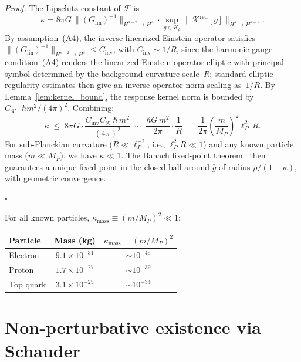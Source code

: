 \documentclass[12pt,a4paper]{article}
\begin{document}
\noindent\emph{Proof.} The Lipschitz constant of $\mathcal{F}$ is
\begin{equation}
\kappa = 8\pi G\,\bigl\|(G_{\mathrm{lin}})^{-1}\bigr\|_{H^{s-2}\to H^s}
\cdot \sup_{g \in K_\rho}
\bigl\|\mathcal{K}^{\mathrm{red}}[g]\bigr\|_{H^s \to H^{s-2}}.
\end{equation}
By assumption~(A4), the inverse linearized Einstein operator satisfies
$\|(G_{\mathrm{lin}})^{-1}\|_{H^{s-2}\to H^s} \leq C_{\mathrm{inv}}$, with
$C_{\mathrm{inv}} \sim 1/R$, since the harmonic gauge condition~(A4) renders the linearized Einstein operator elliptic with principal symbol determined by the background curvature scale~$R$; standard elliptic regularity estimates then give an inverse operator norm scaling as~$1/R$. By Lemma~\ref{lem:kernel_bound}, the response
kernel norm is bounded by $C_{\mathcal{K}} \cdot \hbar m^2/(4\pi)^2$. Combining:
\begin{equation}
\kappa \;\leq\; 8\pi G \cdot \frac{C_{\mathrm{inv}}C_{\mathcal{K}}\,\hbar\, m^2}{(4\pi)^2}
\;\sim\; \frac{\hbar G\, m^2}{2\pi}
\cdot \frac{1}{R}
\;=\; \frac{1}{2\pi}\!\left(\frac{m}{M_P}\right)^{\!2}\ell_P^2\, R.
\end{equation}
For sub-Planckian curvature ($R \ll \ell_P^{-2}$, i.e., $\ell_P^2 R \ll 1$)
and any known particle mass ($m \ll M_P$), we have $\kappa \ll 1$.
The Banach fixed-point theorem~\cite{banach} then guarantees a unique
fixed point in the closed ball around $\bar{g}$ of radius
$\rho/(1-\kappa)$, with geometric convergence.

\hfill$\square$

\medskip

For all known particles, $\kappa_{\text{mass}} \equiv (m/M_P)^2 \ll 1$:
\begin{center}
\begin{tabular}{lcc}
\toprule
Particle & Mass (kg) & $\kappa_{\text{mass}} = (m/M_P)^2$ \\
\midrule
Electron & $9.1\times10^{-31}$ & $\sim 10^{-45}$ \\
Proton & $1.7\times10^{-27}$ & $\sim 10^{-39}$ \\
Top quark & $3.1\times10^{-25}$ & $\sim 10^{-34}$ \\
\bottomrule
\end{tabular}
\end{center}

\section{Non-perturbative existence via Schauder}
\label{sec:schauder}
\end{document}
